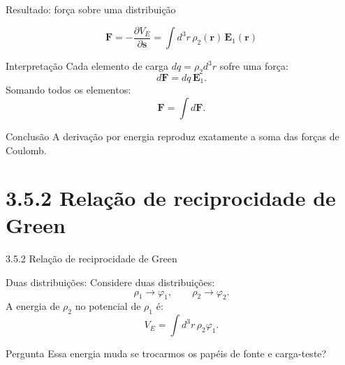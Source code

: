 \documentclass[aspectratio=169,11pt]{beamer}
\begin{document}
\begin{frame}{Resultado: força sobre uma distribuição}

\begin{eqbox}
\begin{equation}
\mathbf F
=
-\frac{\partial V_E}{\partial \mathbf s}
=
\int d^3r\, \rho_2(\mathbf r)\,\mathbf E_1(\mathbf r)
\tag{3.69}
\end{equation}
\end{eqbox}

\begin{mybox}{Interpretação}
Cada elemento de carga \(dq=\rho_2d^3r\) sofre uma força:
\[
d\mathbf F = dq\,\mathbf E_1.
\]
Somando todos os elementos:
\[
\mathbf F = \int d\mathbf F.
\]
\end{mybox}

\begin{alertblock}{Conclusão}
A derivação por energia reproduz exatamente a soma das forças de Coulomb.
\end{alertblock}

\end{frame}

\section{3.5.2 Relação de reciprocidade de Green}

\begin{frame}{3.5.2 Relação de reciprocidade de Green}

\begin{mybox}{Duas distribuições: }
Considere duas distribuições:
\[
\rho_1 \longrightarrow \varphi_1,
\qquad
\rho_2 \longrightarrow \varphi_2.
\]
A energia de \(\rho_2\) no potencial de \(\rho_1\) é:
\[
V_E=\int d^3r\,\rho_2\varphi_1.
\]
\end{mybox}

\begin{alertblock}{Pergunta}
Essa energia muda se trocarmos os papéis de fonte e carga-teste?
\end{alertblock}

\end{frame}
\end{document}
